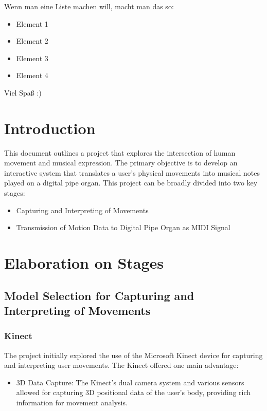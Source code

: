 \documentclass[]{article}
\begin{document}
Wenn man eine Liste machen will, macht man das so:

\begin{itemize}
	\item Element 1
	\item Element 2
	\item Element 3
	\item Element 4
\end{itemize}

Viel Spaß :)

\newpage
\section{Introduction}

This document outlines a project that explores the intersection of human movement and musical expression. The primary objective is to develop an interactive system that translates a user's physical movements into musical notes played on a digital pipe organ. This project can be broadly divided into two key stages:

\begin{itemize}
	\item Capturing and Interpreting of Movements
	\item Transmission of Motion Data to Digital Pipe Organ as MIDI Signal
\end{itemize}

\section{Elaboration on Stages}

\subsection{Model Selection for Capturing and Interpreting of Movements}

\subsubsection{Kinect}

The project initially explored the use of the Microsoft Kinect device for capturing and interpreting user movements. The Kinect offered one main advantage:

\begin{itemize} 
\item 3D Data Capture: The Kinect's dual camera system and various sensors allowed for capturing 3D positional data of the user's body, providing rich information for movement analysis.
\end{itemize}
\end{document}
